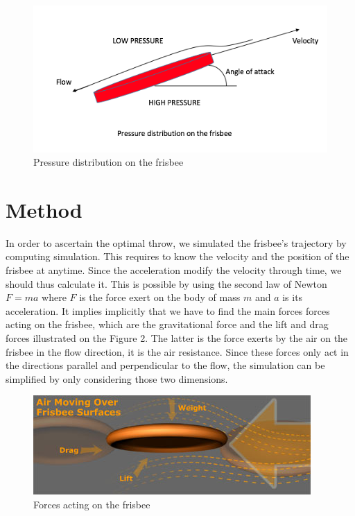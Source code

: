 \documentclass[10pt,a4paper]{report}
\begin{document}
\begin{figure}[!h]
\centering
\includegraphics[scale=0.6]{Intro.jpg}
\caption{Pressure distribution on the frisbee}
\label{Pressure distribution on the frisbee}
\end{figure}

\section{Method}
In order to ascertain the optimal throw, we simulated the frisbee's trajectory by computing simulation. This requires to know the velocity and the position of the frisbee at anytime. Since the acceleration modify the velocity through time, we should thus calculate it. This is possible by using the second law of Newton $F = ma$ where $F$ is the force exert on the body of mass $m$ and $a$ is its acceleration. It implies implicitly that we have to find the main forces forces acting on the frisbee,  which are the gravitational force and the lift and drag forces illustrated on the Figure 2. The latter is the force exerts by the air on the frisbee in the flow direction, it is the air resistance. Since these forces only act in the directions parallel and perpendicular to the flow, the simulation can be simplified by only considering those two dimensions.

\begin{figure}[!h]
\centering
\includegraphics[scale=0.8]{forces.jpg}
\caption{Forces acting on the frisbee}
\label{Forces acting on the frisbee}
\end{figure}
\end{document}
